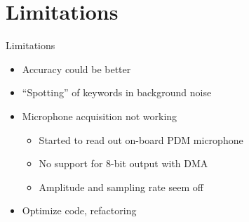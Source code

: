 \documentclass{beamer}
\begin{document}
\section{Limitations}
\begin{frame}{Limitations}
	\begin{itemize}
		\item<2->Accuracy could be better
		\item<3->``Spotting'' of keywords in background noise
		\item<4->Microphone acquisition not working
		\begin{itemize}
			\item<5->Started to read out on-board PDM microphone
			\item<6->No support for 8-bit output with DMA
			\item<7->Amplitude and sampling rate seem off
		\end{itemize}

		\item<8->Optimize code, refactoring
	\end{itemize}
\end{frame}
\end{document}
